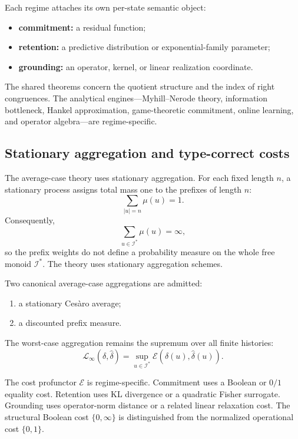 \documentclass[12pt]{article}
\theoremstyle{definition}
\begin{document}
Each regime attaches its own per-state semantic object:
\begin{itemize}[nosep]
\item \textbf{commitment:} a residual function;
\item \textbf{retention:} a predictive distribution or exponential-family
parameter;
\item \textbf{grounding:} an operator, kernel, or linear realization
coordinate.
\end{itemize}

The shared theorems concern the quotient structure and the index of right
congruences.  The analytical engines---Myhill--Nerode theory, information
bottleneck, Hankel approximation, game-theoretic commitment, online learning,
and operator algebra---are regime-specific.

\subsection{Stationary aggregation and type-correct costs}
\label{subsec:stationary-intro}

The average-case theory uses stationary aggregation.  For each fixed length
$n$, a stationary process assigns total mass one to the prefixes of length $n$:
\[
\sum_{|u|=n}\mu(u)=1.
\]
Consequently,
\[
\sum_{u\in\mathcal I^*}\mu(u)=\infty,
\]
so the prefix weights do not define a probability measure on the whole free
monoid $\mathcal I^*$.  The theory uses stationary aggregation schemes.

Two canonical average-case aggregations are admitted:
\begin{enumerate}[nosep,label=(\alph*)]
\item a stationary Ces\`aro average;
\item a discounted prefix measure.
\end{enumerate}

The worst-case aggregation remains the supremum over all finite histories:
\[
\mathcal L_\infty(\delta,\widehat\delta)
=
\sup_{u\in\mathcal I^*}
\mathcal E(\delta(u),\widehat\delta(u)).
\]

The cost profunctor $\mathcal E$ is regime-specific.  Commitment uses a
Boolean or $0/1$ equality cost.  Retention uses KL divergence or a quadratic
Fisher surrogate.  Grounding uses operator-norm distance or a related linear
relaxation cost.  The structural Boolean cost $\{0,\infty\}$ is distinguished
from the normalized operational cost $\{0,1\}$.
\end{document}
